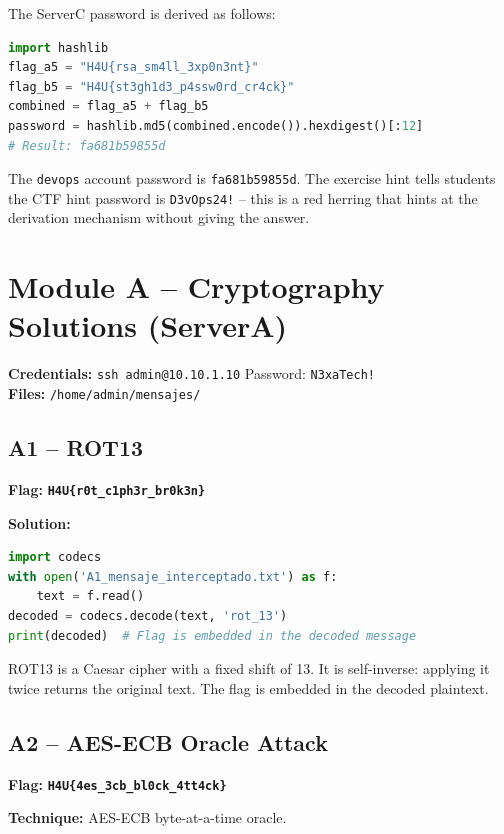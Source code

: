 \documentclass[a4paper, 12pt]{article}
\newcommand{\flag}[1]{\texttt{\color{flagcolor}\bfseries #1}}
\begin{document}
The ServerC password is derived as follows:

\begin{lstlisting}[language=python]
import hashlib
flag_a5 = "H4U{rsa_sm4ll_3xp0n3nt}"
flag_b5 = "H4U{st3gh1d3_p4ssw0rd_cr4ck}"
combined = flag_a5 + flag_b5
password = hashlib.md5(combined.encode()).hexdigest()[:12]
# Result: fa681b59855d
\end{lstlisting}

The \texttt{devops} account password is \texttt{fa681b59855d}.
The exercise hint tells students the CTF hint password is \texttt{D3vOps24!} --
this is a red herring that hints at the derivation mechanism without giving the answer.

\section{Module A -- Cryptography Solutions (ServerA)}

\textbf{Credentials:} \texttt{ssh admin@10.10.1.10} \quad Password: \texttt{N3xaTech!}\\
\textbf{Files:} \texttt{/home/admin/mensajes/}

\subsection{A1 -- ROT13}

\textbf{Flag:} \flag{H4U\{r0t\_c1ph3r\_br0k3n\}}

\textbf{Solution:}
\begin{lstlisting}[language=python]
import codecs
with open('A1_mensaje_interceptado.txt') as f:
    text = f.read()
decoded = codecs.decode(text, 'rot_13')
print(decoded)  # Flag is embedded in the decoded message
\end{lstlisting}

ROT13 is a Caesar cipher with a fixed shift of 13. It is self-inverse: applying
it twice returns the original text. The flag is embedded in the decoded plaintext.

\subsection{A2 -- AES-ECB Oracle Attack}

\textbf{Flag:} \flag{H4U\{4es\_3cb\_bl0ck\_4tt4ck\}}

\textbf{Technique:} AES-ECB byte-at-a-time oracle.
\end{document}
